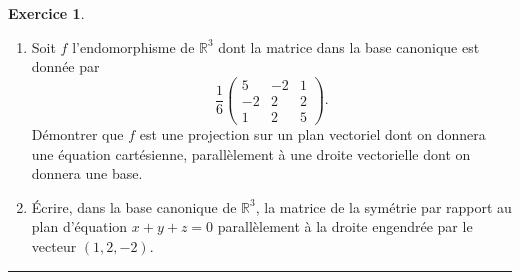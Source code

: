 \documentclass[a4paper,10pt]{article}
\theoremstyle{definition}
\theoremstyle{definition}
\newtheorem{exo}{Exercice}
\newcommand{\R}{\mathbb{R}}
\begin{document}
\begin{exo}\textbf{}\quad\\[0.25cm]
  \begin{enumerate}
	\item Soit $f$ l'endomorphisme de $\R^3$ dont la matrice dans la
	base canonique est donnée par
	\[
	\frac{1}{6}\begin{pmatrix}
	5 & -2 & 1\\
	-2 & 2 & 2\\
	1 & 2 & 5
	\end{pmatrix}.
	\]
	Démontrer que $f$ est une projection sur un plan vectoriel dont on
	donnera une équation cartésienne, parallèlement à une droite
	vectorielle dont on donnera une base.
	\item Écrire, dans la base canonique de $\R^3$, la matrice de la
	symétrie par rapport au plan d'équation $x+y+z=0$ parallèlement à
	la droite engendrée par le vecteur $(1,2,-2)$.
\end{enumerate}

\centering
\rule{1\linewidth}{0.6pt}
\end{exo}
\end{document}
